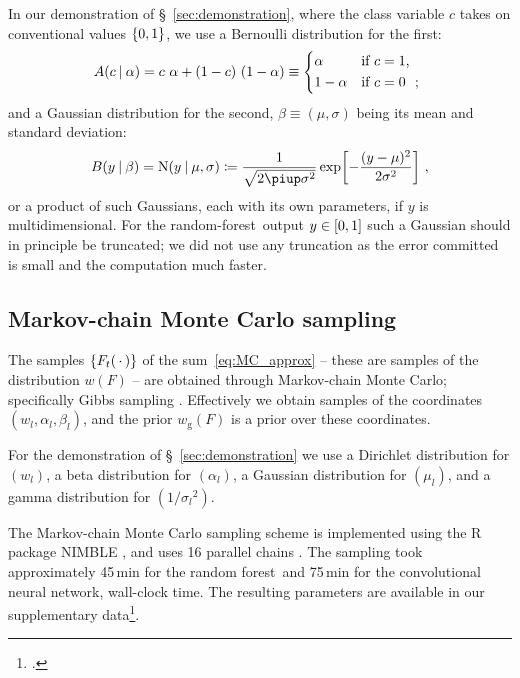 \documentclass[\ifafour a4paper,12pt,\else a5paper,10pt,\fi%
onecolumn,oneside,article,%
british%
]{memoir}
\theoremstyle{remark}
\theoremstyle{innote}
\newcommand*{\pu}{\piup}%
\newcommand*{\defd}{\coloneqq}
\newcommand*{\dotv}{\mathord{\,\cdot\,}}%
\DeclarePairedDelimiter\clcl{[}{]}
\DeclarePairedDelimiter\set{\{}{\}} %
\renewcommand*{\|}[1][]{\nonscript\:#1\vert\nonscript\:\mathopen{}}
\newcommand*{\sect}{\S}%
\newcommand*{\chap}{ch.}%
\newcommand*{\wf}{w}
\newcommand*{\wfo}{w_{\textrm{g}}}
\newcommand*{\RF}{random forest}
\newcommand*{\rf}{random-forest}
\newcommand*{\CNN}{convolutional neural network}
\newcommand*{\No}{\mathrm{N}}
\begin{document}
In our demonstration of \sect~\ref{sec:demonstration}, where the class variable $c$ takes on conventional values $\set{0,1}$, we use a Bernoulli distribution for the first:
\begin{equation}
  \label{eq:distr_class}
  A(c \| \alpha) = c\ \alpha + (1-c)\ (1-\alpha) \equiv
  \begin{dcases*}
    \alpha& if $c=1$, \\ 1-\alpha & if $c=0$ \ ;
  \end{dcases*}
\end{equation}
and a Gaussian distribution for the second, $\beta \equiv (\mu,\sigma)$ being its mean and standard deviation:
\begin{equation}
  \label{eq:distr_output}
  B(y \| \beta) = \No(y \| \mu, \sigma) \defd \frac{1}{\sqrt{2\pu\sigma^{2}}} \exp\biggl[-\frac{(y-\mu)^{2}}{2\sigma^{2}}\biggr] \ ,
\end{equation}
or a product of such Gaussians, each with its own parameters, if $y$ is multidimensional. For the \rf\ output $y\in \clcl{0,1}$ such a Gaussian should in principle be truncated; we did not use any truncation as the error committed is small and the computation much faster.



\subsection{Markov-chain Monte Carlo sampling}
\label{sec:MCMC}

The samples $\set{F_{t}(\dotv)}$ of the sum~\eqref{eq:MC_approx} -- these are samples of the distribution $\wf(F)$ -- are obtained through Markov-chain Monte Carlo; specifically Gibbs sampling \autocites{neal1993}[\chap~29]{mackay1995_r2005}.
Effectively we obtain samples of the coordinates $(w_{l}, \alpha_{l}, \beta_{l})$, and the prior $\wfo(F)$ is a prior over these coordinates.

For the demonstration of \sect~\ref{sec:demonstration} we use a Dirichlet distribution for $(w_{l})$, a beta distribution for $(\alpha_{l})$, a Gaussian distribution for $(\mu_{l})$, and a gamma distribution for $(1/{\sigma_{l}}^{2})$.

The Markov-chain Monte Carlo sampling scheme is implemented using the R \autocites{rcoreteam1995_r2022} package NIMBLE \autocites{nimble2016_r2021}, and uses 16 parallel chains \autocites[scripts available in][]{dyrlandetal2022c}.
The sampling took approximately 45\,min for the \RF\ and 75\,min for the \CNN, wall-clock time. The resulting parameters are available in our supplementary data\footcites[\addcomma\ files \texttt{transducer\_params-Random\_Forest.zip} and \texttt{transducer\_params-Neural\_Net.zip}]{dyrlandetal2022c}.
\end{document}
